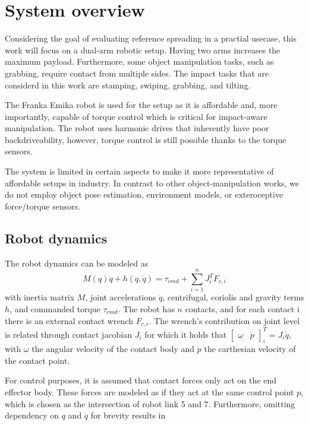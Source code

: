 \documentclass[a4paper, 10pt, conference]{ieeeconf}
\begin{document}
    \section{System overview}
    Considering the goal of evaluating reference spreading in a practial usecase, this work will focus on a dual-arm robotic setup. Having two arms increases the maximum payload. Furthermore, some object manipulation tasks, such as grabbing, require contact from multiple sides. The impact tasks that are considerd in this work are stamping, swiping, grabbing, and tilting. 

    The Franka Emika robot \cite{haddadinFrankaEmikaRobot2022} is used for the setup as it is affordable and, more importantly, capable of torque control which is critical for impact-aware manipulation. The robot uses harmonic drives that inherently have poor backdriveability, however, torque control is still possible thanks to the torque sensors. 

    The system is limited in certain aspects to make it more representative of affordable setups in industry. In contrast to other object-manipulation works, we do not employ object pose estimation, environment models, or exteroceptive force/torque sensors. 

    \subsection{Robot dynamics}
    The robot dynamics can be modeled as 
    $$M(q)\ddot{q}+h(q,\dot{q})= \tau_{cmd} + \sum_{i=1}^n J_i^TF_{c,i}$$
    with inertia matrix $M$, joint accelerations $\ddot{q}$, centrifugal, coriolis and gravity terms $h$, and commanded torque $\tau_{cmd}$. The robot has $n$ contacts, and for each contact i there is an external contact wrench $F_{c,i}$. The wrench's contribution on joint level is related through contact jacobian $J_i$ for which it holds that $\begin{bmatrix} \omega & \dot{p} \end{bmatrix}_i^T=J_i\dot{q}$, with $\omega$ the angular velocity of the contact body and $\dot{p}$ the carthesian velocity of the contact point. 

    For control purposes, it is assumed that contact forces only act on the end effector body. These forces are modeled as if they act at the same control point $p$, which is chosen as the intersection of robot link 5 and 7. Furthermore, omitting dependency on $q$ and $\dot{q}$ for brevity results in
\end{document}
